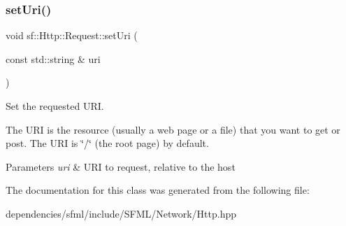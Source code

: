 \subsubsection{\texorpdfstring{set\+Uri()}{setUri()}}
{\footnotesize\ttfamily void sf\+::\+Http\+::\+Request\+::set\+Uri (\begin{DoxyParamCaption}\item[{const std\+::string \&}]{uri }\end{DoxyParamCaption})}



Set the requested U\+RI. 

The U\+RI is the resource (usually a web page or a file) that you want to get or post. The U\+RI is \char`\"{}/\char`\"{} (the root page) by default.


\begin{DoxyParams}{Parameters}
{\em uri} & U\+RI to request, relative to the host \\
\hline
\end{DoxyParams}


The documentation for this class was generated from the following file\+:\begin{DoxyCompactItemize}
\item 
dependencies/sfml/include/\+S\+F\+M\+L/\+Network/Http.\+hpp\end{DoxyCompactItemize}
